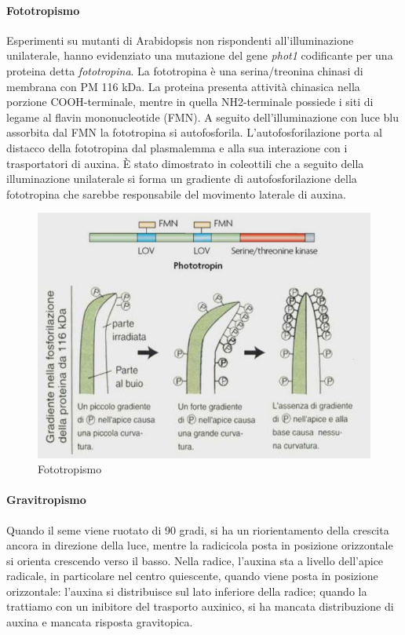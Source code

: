 \documentclass[a4paper,12pt]{book}
\begin{document}
\paragraph{Fototropismo}
Esperimenti su mutanti di Arabidopsis non rispondenti all’illuminazione unilaterale, hanno evidenziato una
mutazione del gene \emph{phot1} codificante per una proteina detta \emph{fototropina}. La fototropina è una
serina/treonina chinasi di membrana con PM 116 kDa. La proteina presenta attività chinasica nella
porzione COOH-terminale, mentre in quella NH2-terminale possiede i siti di legame al flavin
mononucleotide (FMN). A seguito dell’illuminazione con luce blu assorbita dal FMN la fototropina si
autofosforila.
L’autofosforilazione porta al distacco della fototropina dal plasmalemma e alla sua interazione con i
trasportatori di auxina. È stato dimostrato in coleottili che a seguito della illuminazione unilaterale si forma
un gradiente di autofosforilazione della fototropina che sarebbe responsabile del movimento laterale di
auxina.
\begin{figure}[H]
\centering
\includegraphics[scale=0.4]{immagini/fototropina.jpg}
\caption{Fototropismo}
\end{figure}

 
\paragraph{Gravitropismo}
Quando il seme viene ruotato di 90 gradi, si ha un riorientamento della crescita ancora in direzione della luce, mentre la radicicola posta in posizione orizzontale si orienta crescendo verso il basso. Nella radice, l'auxina sta a livello dell'apice radicale, in particolare nel centro quiescente, quando viene posta in posizione orizzontale: l'auxina si distribuisce sul lato inferiore della radice; quando la trattiamo con un inibitore del trasporto auxinico, si ha mancata distribuzione di auxina e mancata risposta gravitopica.
\end{document}
